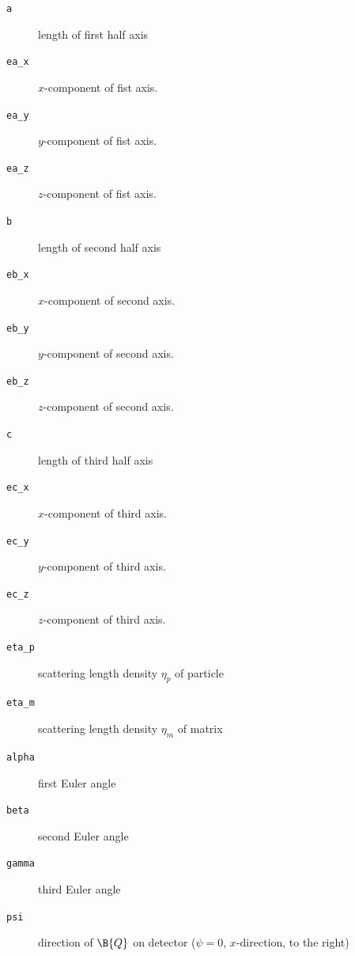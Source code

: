 \begin{description}
\item[\texttt{a}] length of first half axis
\item[\texttt{ea\_x}] $x$-component of fist axis.
\item[\texttt{ea\_y}] $y$-component of fist axis.
\item[\texttt{ea\_z}] $z$-component of fist axis.
\item[\texttt{b}] length of second half axis
\item[\texttt{eb\_x}] $x$-component of second axis.
\item[\texttt{eb\_y}] $y$-component of second axis.
\item[\texttt{eb\_z}] $z$-component of second axis.
\item[\texttt{c}] length of third half axis
\item[\texttt{ec\_x}] $x$-component of third axis.
\item[\texttt{ec\_y}] $y$-component of third axis.
\item[\texttt{ec\_z}] $z$-component of third axis.
\item[\texttt{eta\_p}] scattering length density $\eta_p$ of particle
\item[\texttt{eta\_m}] scattering length density $\eta_m$ of matrix
\item[\texttt{alpha}] first Euler angle
\item[\texttt{beta}] second Euler angle
\item[\texttt{gamma}] third Euler angle
\item[\texttt{psi}] direction of $\B{Q}$ on detector ($\psi=0$, $x$-direction, to the right)
\end{description}


